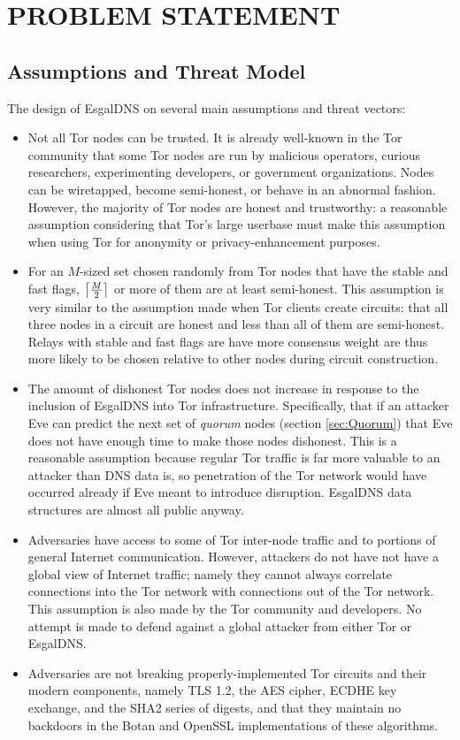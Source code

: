 
\chapter{PROBLEM STATEMENT}

\section{Assumptions and Threat Model}

The design of EsgalDNS on several main assumptions and threat vectors:

\begin{itemize}
  \item Not all Tor nodes can be trusted. It is already well-known in the Tor community that some Tor nodes are run by malicious operators, curious researchers, experimenting developers, or government organizations. Nodes can be wiretapped, become semi-honest, or behave in an abnormal fashion. However, the majority of Tor nodes are honest and trustworthy: a reasonable assumption considering that Tor's large userbase must make this assumption when using Tor for anonymity or privacy-enhancement purposes.
  \item For an $ M $-sized set chosen randomly from Tor nodes that have the stable and fast flags, $ \ceil[\big]{\frac{M}{2}} $ or more of them are at least semi-honest. This assumption is very similar to the assumption made when Tor clients create circuits: that all three nodes in a circuit are honest and less than all of them are semi-honest. Relays with stable and fast flags are have more consensus weight are thus more likely to be chosen relative to other nodes during circuit construction.
  \item The amount of dishonest Tor nodes does not increase in response to the inclusion of EsgalDNS into Tor infrastructure. Specifically, that if an attacker Eve can predict the next set of \emph{quorum} nodes (section \ref{sec:Quorum}) that Eve does not have enough time to make those nodes dishonest. This is a reasonable assumption because regular Tor traffic is far more valuable to an attacker than DNS data is, so penetration of the Tor network would have occurred already if Eve meant to introduce disruption. EsgalDNS data structures are almost all public anyway.
  \item Adversaries have access to some of Tor inter-node traffic and to portions of general Internet communication. However, attackers do not have not have a global view of Internet traffic; namely they cannot always correlate connections into the Tor network with connections out of the Tor network. This assumption is also made by the Tor community and developers. No attempt is made to defend against a global attacker from either Tor or EsgalDNS.
  \item Adversaries are not breaking properly-implemented Tor circuits and their modern components, namely TLS 1.2, the AES cipher, ECDHE key exchange, and the SHA2 series of digests, and that they maintain no backdoors in the Botan and OpenSSL implementations of these algorithms.
\end{itemize}

